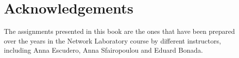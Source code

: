 \chapter*{Acknowledgements}

The assignments presented in this book are the ones that have been prepared over the years in the Network Laboratory course by different instructors, including Anna Escudero, Anna Sfairopoulou and Eduard Bonada.

